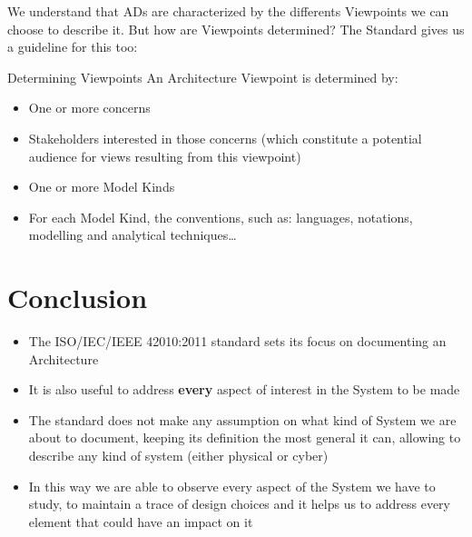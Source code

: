 		\begin{frame}
			We understand that ADs are characterized by the differents Viewpoints we can choose to describe it.\newline\newline
			But how are Viewpoints determined? The Standard gives us a guideline for this too:
			\begin{block}{Determining Viewpoints}
				An Architecture Viewpoint is determined by:
				\begin{itemize}
					\item One or more concerns
					\item Stakeholders interested in those concerns (which constitute a potential audience for views resulting from this viewpoint)
					\item One or more Model Kinds
					\item For each Model Kind, the conventions, such as: languages, notations, modelling and analytical techniques\dots
				\end{itemize}
			\end{block}
		\end{frame}				
		
		\section{Conclusion}
		
		\begin{frame}
			\begin{itemize}
			
			\item The ISO/IEC/IEEE 42010:2011 standard sets its focus on documenting an Architecture
			
			\vspace{0.3cm}
			\item It is also useful to address \textbf{every} aspect of interest in the System to be made
			
			\vspace{0.3cm}
			\item The standard does not make any assumption on what kind of System we are about to document, keeping its definition the most general it can, allowing to describe any kind of system (either physical or cyber)
			\vspace{0.3cm}
			\item In this way we are able to observe every aspect of the System we have to study, to maintain a trace of design choices and it helps us to address every element that could have an impact on it
			\end{itemize}
		\end{frame}
		

